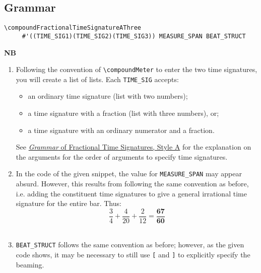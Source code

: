 \subsection{Grammar}
\label{sec:compoundfractionalmeter_grammar}
\begin{verbatim}
\compoundFractionalTimeSignatureAThree 
     #'((TIME_SIG1)(TIME_SIG2)(TIME_SIG3)) MEASURE_SPAN BEAT_STRUCT
\end{verbatim}
\textbf{NB} 
\begin{enumerate}
\item Following the convention of \verb|\compoundMeter| to enter the two time signatures, you will create a list of lists. Each \verb|TIME_SIG| accepts: 
\begin{itemize}
\item an ordinary time signature (list with two numbers);
\item a time signature with a fraction (list with three numbers), or; 
\item a time signature with an ordinary numerator and a fraction.
\end{itemize} 
See \hyperref[sec:time_signatures_styleA_convention]{\textit{Grammar} of Fractional Time Signatures, Style A} for the explanation on the arguments for the order of arguments to specify time signatures.
\item In the code of the given snippet, the value for \verb|MEASURE_SPAN| may appear absurd. However, this results from following the same convention as before, i.e. adding the constituent time signatures to give a general irrational time signature for the entire bar. Thus: \\
\[ \frac{3}{4} +\frac{4}{20} + \frac{2}{12} = \mathbf{\frac{67}{60}}\] \\
\item \verb|BEAT_STRUCT| follows the same convention as before; however, as the given code shows, it may be necessary to still use \verb|[| and \verb|]| to explicitly specify the beaming. 
\end{enumerate}

